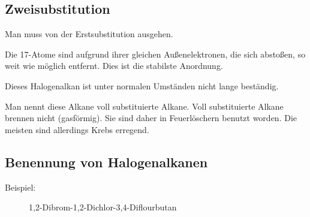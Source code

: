 \subsection{Zweisubstitution}
Man muss von der Erstsubstitution ausgehen.

 \chemsign{+} 
\chemsign{\ce{->}} 
\chemsign{+} 

\vspace{0.3ex}
Die \ac{17}-Atome sind aufgrund ihrer gleichen Außenelektronen, die sich abstoßen, so weit wie möglich
entfernt. Dies ist die stabilste Anordnung.

\begin{minipage}{0.3\hsize}
\end{minipage}\hfill
\begin{minipage}{0.6\hsize}
	Dieses Halogenalkan ist unter normalen Umständen nicht lange beständig.
\end{minipage}

\vspace{0.3ex}
Man nennt diese Alkane voll substituierte Alkane.
Voll substituierte Alkane brennen nicht (gasförmig).
Sie sind daher in Feuerlöschern benutzt worden.
Die meisten sind allerdings Krebs erregend.


\subsection{Benennung von Halogenalkanen}
\begin{description}
	\item[Beispiel:] 
		\hspace{3em} 1,2-Dibrom-1,2-Dichlor-3,4-Diflourbutan
\end{description}

